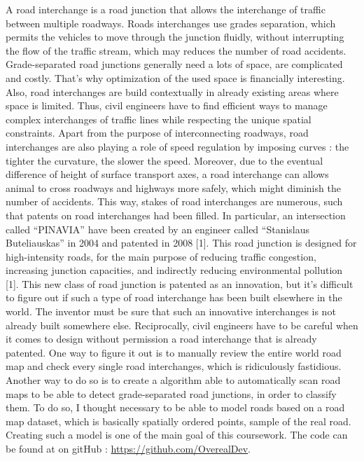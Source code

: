 
	A road interchange is a road junction that allows the interchange of traffic between multiple roadways. Roads interchanges use grades separation, which permits the vehicles to move through the junction fluidly, without interrupting the flow of the traffic stream, which may reduces the number of road accidents.
Grade-separated road junctions generally need a lots of space, are complicated and costly. That’s why optimization of the used space is financially interesting. Also, road interchanges are build contextually in already existing areas where space is limited. Thus, civil engineers have to find efficient ways to manage complex interchanges of traffic lines while respecting the unique spatial constraints.
\newline
Apart from the purpose of interconnecting roadways, road interchanges are also playing a role of speed regulation by imposing curves : the tighter the curvature, the slower the speed. Moreover, due to the eventual difference of height of surface transport axes, a road interchange can allows animal to cross roadways and highways more safely, which might diminish the number of accidents.
This way, stakes of road interchanges are numerous, such that patents on road interchanges had been filled. In particular, an intersection called “PINAVIA” have been created by an engineer called “Stanislaus Buteliauskas” in 2004 and patented in 2008 [1]. This road junction is designed for high-intensity roads, for the main purpose of reducing traffic congestion, increasing junction capacities, and indirectly reducing environmental pollution [1]. This new class of road junction is patented as an innovation, but it’s difficult to figure out if such a type of road interchange has been built elsewhere in the world. The inventor must be sure that such an innovative interchanges is not already built somewhere else. Reciprocally, civil engineers have to be careful when it comes to design without permission a road interchange that is already patented. One way to figure it out is to manually review the entire world road map and check every single road interchanges, which is ridiculously fastidious. Another way to do so is to create a algorithm able to automatically scan road maps to be able to detect grade-separated road junctions, in order to classify them. To do so, I thought necessary to be able to model roads based on a road map dataset, which is basically spatially ordered points, sample of the real road. Creating such a model is one of the main goal of this coursework. The code can be found at on gitHub : \url{https://github.com/OverealDev}.
